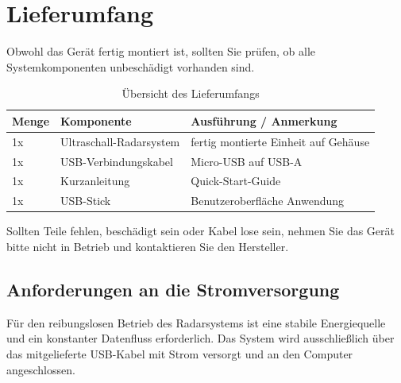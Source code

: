 %
%

\chapter{Lieferumfang}

Obwohl das Gerät fertig montiert ist, sollten Sie prüfen, ob alle Systemkomponenten unbeschädigt vorhanden sind.

\begin{table}[htbp]
	\centering
	\renewcommand{\arraystretch}{1.3} 
	
	\begin{tabular}{|l|l|l|}
		\hline
		\textbf{Menge} & \textbf{Komponente} & \textbf{Ausführung / Anmerkung} \\ \hline
		1x & Ultraschall-Radarsystem & fertig montierte Einheit auf Gehäuse \\ \hline
		1x & USB-Verbindungskabel & Micro-USB auf USB-A \\ \hline
		1x & Kurzanleitung & Quick-Start-Guide \\ 
		\hline
		1x & USB-Stick & Benutzeroberfläche Anwendung \\ \hline
	\end{tabular}
	\caption{Übersicht des Lieferumfangs}
	\label{tab:lieferumfang}
\end{table}

\vspace{0.5cm}
\noindent Sollten Teile fehlen, beschädigt sein oder Kabel lose sein, nehmen Sie das Gerät bitte nicht in Betrieb und kontaktieren Sie den Hersteller.

\section{Anforderungen an die Stromversorgung}
Für den reibungslosen Betrieb des Radarsystems ist eine stabile Energiequelle und ein konstanter Datenfluss erforderlich. Das System wird ausschlie\ss lich über das mitgelieferte USB-Kabel mit Strom versorgt und an den Computer angeschlossen.

